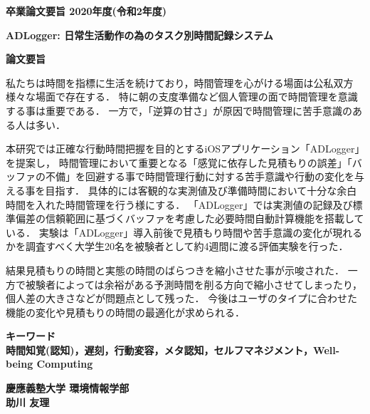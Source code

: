 \begin{center}
\textbf{\Large 卒業論文要旨 2020年度(令和2年度)}

\vspace{6.18mm}

\textbf{\Large ADLogger: 日常生活動作の為のタスク別時間記録システム}
\end{center}

\vspace{10mm}

\begin{flushleft}
\textbf{論文要旨}\\
\end{flushleft}

私たちは時間を指標に生活を続けており，時間管理を心がける場面は公私双方様々な場面で存在する．
特に朝の支度準備など個人管理の面で時間管理を意識する事は重要である．
一方で，「逆算の甘さ」が原因で時間管理に苦手意識のある人は多い．

本研究では正確な行動時間把握を目的とするiOSアプリケーション「ADLogger」を提案し，
時間管理において重要となる「感覚に依存した見積もりの誤差」「バッファの不備」を回避する事で時間管理行動に対する苦手意識や行動の変化を与える事を目指す．
具体的には客観的な実測値及び準備時間において十分な余白時間を入れた時間管理を行う様にする．
「ADLogger」では実測値の記録及び標準偏差の信頼範囲に基づくバッファを考慮した必要時間自動計算機能を搭載している．
実験は「ADLogger」導入前後で見積もり時間や苦手意識の変化が現れるかを調査すべく大学生20名を被験者として約4週間に渡る評価実験を行った．

結果見積もりの時間と実態の時間のばらつきを縮小させた事が示唆された．
一方で被験者によっては余裕がある予測時間を削る方向で縮小させてしまったり，個人差の大きさなどが問題点として残った．
今後はユーザのタイプに合わせた機能の変化や見積もりの時間の最適化が求められる．

\begin{flushleft}
\textbf{キーワード}\\
\textbf{時間知覚(認知)，遅刻，行動変容，メタ認知，セルフマネジメント，Well-being Computing}

\end{flushleft}

\begin{flushright}
\textbf{慶應義塾大学 環境情報学部}\\
\textbf{助川 友理}
\end{flushright}
\newpage

